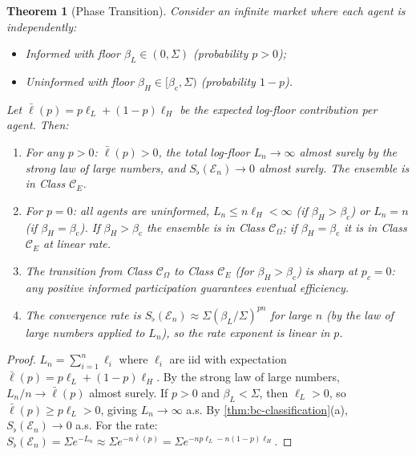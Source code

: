 \documentclass[twocolumn,11pt,a4paper]{article}
\newtheorem{theorem}{Theorem}[section]
\theoremstyle{remark}
\newcommand{\Sflat}{S_{\flat}}
\newcommand{\Ens}{\mathcal{E}}
\newcommand{\ClassE}{\mathcal{C}_E}       %
\newcommand{\ClassO}{\mathcal{C}_\Omega}  %
\newcommand{\logfl}{\ell}                 %
\newcommand{\Logfl}{L}                    %
\newcommand{\Crit}{\beta_{\mathrm{c}}}   %
\begin{document}
\begin{theorem}[Phase Transition]
\label{thm:phase}
Consider an infinite market where each agent is independently:
\begin{itemize}
\item \emph{Informed} with floor $\beta_L \in (0,\Sigma)$ (probability $p>0$);
\item \emph{Uninformed} with floor $\beta_H \in [\Crit, \Sigma)$
  (probability $1-p$).
\end{itemize}
Let $\bar\logfl(p) = p\logfl_L + (1-p)\logfl_H$ be the expected log-floor
contribution per agent.  Then:
\begin{enumerate}[label=\textup{(\alph*)}]
\item For any $p > 0$: $\bar\logfl(p) > 0$, the total log-floor
  $\Logfl_n \to \infty$ almost surely by the strong law of large numbers,
  and $\Sflat(\Ens_n) \to 0$ almost surely.  The ensemble is in Class
  $\ClassE$.
\item For $p = 0$: all agents are uninformed, $\Logfl_n \le n \logfl_H < \infty$
  (if $\beta_H > \Crit$) or $\Logfl_n = n$ (if $\beta_H = \Crit$).
  If $\beta_H > \Crit$ the ensemble is in Class $\ClassO$; if
  $\beta_H = \Crit$ it is in Class $\ClassE$ at linear rate.
\item The transition from Class $\ClassO$ to Class $\ClassE$ (for $\beta_H >
  \Crit$) is sharp at $p_c = 0$: any positive informed participation
  guarantees eventual efficiency.
\item The convergence rate is $\Sflat(\Ens_n) \approx \Sigma(\beta_L/\Sigma)^{pn}$
  for large $n$ (by the law of large numbers applied to $\Logfl_n$), so the
  rate exponent is linear in $p$.
\end{enumerate}
\end{theorem}
\begin{proof}
$\Logfl_n = \sum_{i=1}^n \logfl_i$ where $\logfl_i$ are iid with
expectation $\bar\logfl(p) = p\logfl_L + (1-p)\logfl_H$.  By the strong
law of large numbers, $\Logfl_n/n \to \bar\logfl(p)$ almost surely.
If $p > 0$ and $\beta_L < \Sigma$, then $\logfl_L > 0$, so
$\bar\logfl(p) \ge p\logfl_L > 0$, giving $\Logfl_n \to \infty$ a.s.
By \cref{thm:bc-classification}(a), $\Sflat(\Ens_n) \to 0$ a.s.
For the rate: $\Sflat(\Ens_n) = \Sigma e^{-\Logfl_n} \approx
\Sigma e^{-n\bar\logfl(p)} = \Sigma e^{-np\logfl_L - n(1-p)\logfl_H}$.
\end{proof}
\end{document}
